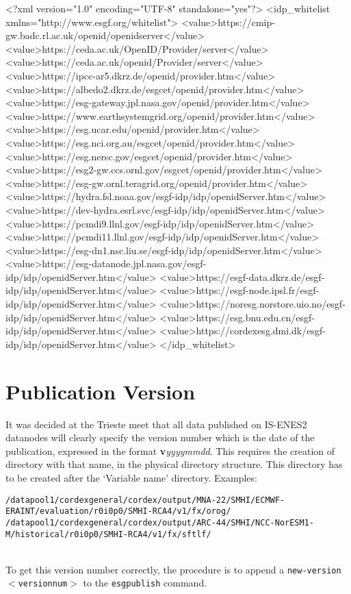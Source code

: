 \begin{tiny}
\begin{verbatimtab}[4]
<?xml version="1.0" encoding="UTF-8" standalone="yes"?>
<idp_whitelist xmlns="http://www.esgf.org/whitelist">
	<value>https://cmip-gw.badc.rl.ac.uk/openid/openidserver</value>
	<value>https://ceda.ac.uk/OpenID/Provider/server</value>
	<value>https://ceda.ac.uk/openid/Provider/server</value>
	<value>https://ipcc-ar5.dkrz.de/openid/provider.htm</value>
	<value>https://albedo2.dkrz.de/esgcet/openid/provider.htm</value>
	<value>https://esg-gateway.jpl.nasa.gov/openid/provider.htm</value>
	<value>https://www.earthsystemgrid.org/openid/provider.htm</value>
	<value>https://esg.ucar.edu/openid/provider.htm</value>
	<value>https://esg.nci.org.au/esgcet/openid/provider.htm</value>
	<value>https://esg.nersc.gov/esgcet/openid/provider.htm</value>
	<value>https://esg2-gw.ccs.ornl.gov/esgcet/openid/provider.htm</value>
	<value>https://esg-gw.ornl.teragrid.org/openid/provider.htm</value>
    <value>https://hydra.fsl.noaa.gov/esgf-idp/idp/openidServer.htm</value>
    <value>https://dev-hydra.esrl.svc/esgf-idp/idp/openidServer.htm</value>
    <value>https://pcmdi9.llnl.gov/esgf-idp/idp/openidServer.htm</value>
    <value>https://pcmdi11.llnl.gov/esgf-idp/idp/openidServer.htm</value>
    <value>https://esg-dn1.nsc.liu.se/esgf-idp/idp/openidServer.htm</value>
    <value>https://esg-datanode.jpl.nasa.gov/esgf-idp/idp/openidServer.htm</value>
    <value>https://esgf-data.dkrz.de/esgf-idp/idp/openidServer.htm</value>
    <value>https://esgf-node.ipsl.fr/esgf-idp/idp/openidServer.htm</value>
    <value>https://noresg.norstore.uio.no/esgf-idp/idp/openidServer.htm</value>
	<value>https://esg.bnu.edu.cn/esgf-idp/idp/openidServer.htm</value>
	<value>https://cordexesg.dmi.dk/esgf-idp/idp/openidServer.htm</value>
</idp_whitelist>
\end{verbatimtab}
\end{tiny}

\section{Publication Version}
It was decided at the Trieste meet that all data published on IS-ENES2 datanodes will clearly specify the version number which is the date of the publication, expressed in the format \textbf{v}\textit{yyyymmdd}. This requires the creation of directory with that name, in the physical directory structure. This directory has to be created after the `Variable name' directory. Examples:\\
\begin{tiny}
\texttt{/datapool1/cordexgeneral/cordex/output/MNA-22/SMHI/ECMWF-ERAINT/evaluation/r0i0p0/SMHI-RCA4/v1/fx/orog/}\\
\texttt{/datapool1/cordexgeneral/cordex/output/ARC-44/SMHI/NCC-NorESM1-M/historical/r0i0p0/SMHI-RCA4/v1/fx/sftlf/}\\
\end{tiny}
\\To get this version number correctly, the procedure is to append a \texttt{\myopt new-version $<$versionnum$>$} to the \texttt{esgpublish} command.

